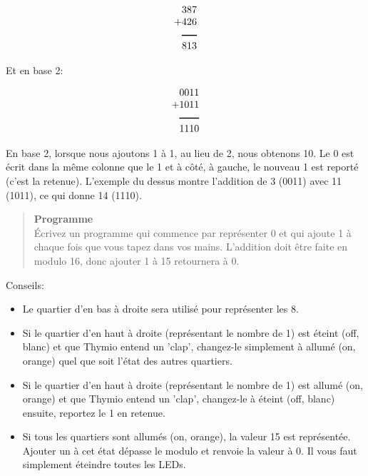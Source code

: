 \begin{displaymath}
\begin{array}{r}
387\\
+426\\
\rule[1pt]{1.5em}{1pt}\\
813\\
\end{array}
\end{displaymath}

Et en base 2:

\begin{displaymath}
\begin{array}{r}
0011\\
+1011\\
\rule[1pt]{2em}{1pt}\\
1110\\
\end{array}
\end{displaymath}

En base 2, lorsque nous ajoutons 1 à 1, au lieu de 2, nous obtenons 10. Le 0 est écrit dans la même colonne que le 1 et à côté, à gauche, le nouveau 1 est reporté (c'est la retenue). L'exemple du dessus montre l'addition de 3 (0011) avec 11 (1011), ce qui donne 14 (1110).

\begin{quote}
\textbf{Programme}\\
Écrivez un programme qui commence par représenter 0 et qui ajoute 1 à chaque fois que vous tapez dans vos mains. L'addition doit être faite en modulo 16, donc ajouter 1 à 15 retournera à 0.
\end{quote}

Conseils:

\begin{itemize}
\item Le quartier d'en bas à droite sera utilisé pour représenter les 8.
\item Si le quartier d'en haut à droite (représentant le nombre de 1) est éteint (off, blanc) et que Thymio entend un 'clap', changez-le simplement à allumé (on, orange) quel que soit l'état des autres quartiers.
\item Si le quartier d'en haut à droite (représentant le nombre de 1) est allumé (on, orange) et que Thymio entend un 'clap', changez-le à éteint (off, blanc) ensuite, reportez le 1 en retenue.
\item Si tous les quartiers sont allumés (on, orange), la valeur 15 est représentée. Ajouter un à cet état dépasse le modulo et renvoie la valeur à 0. Il vous faut simplement éteindre toutes les LEDs.
\end{itemize}


